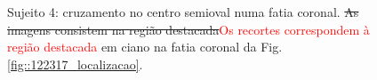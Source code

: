 \begin{figure}[H]
\centering
    \hfill
    \caption{Sujeito 4: cruzamento no centro semioval numa fatia coronal. \sout{As imagens consistem na região destacada}\textcolor{red}{Os recortes correspondem à região destacada} em ciano na fatia coronal da Fig. \ref{fig::122317_localizacao}.
    }
    \label{fig::122317_crossing}
\end{figure}

